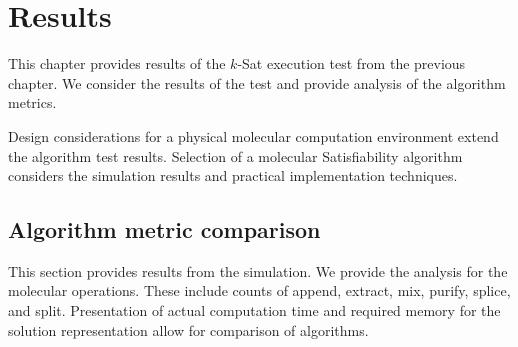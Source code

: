 \chapter{Results}

This chapter provides results of the $k$-{\sc Sat} execution test from the previous chapter.  We consider the results of the test and provide analysis of the algorithm metrics.  

Design considerations for a physical molecular computation environment extend the algorithm test results.  Selection of a molecular {\sc Satisfiability} algorithm considers the simulation results and practical implementation techniques.

	\section{Algorithm metric comparison}
	
This section provides results from the simulation.  We provide the analysis for the molecular operations.  These include counts of append, extract, mix, purify, splice, and split.  Presentation of actual computation time and required memory for the solution representation allow for comparison of algorithms.

\FloatBarrier
		


